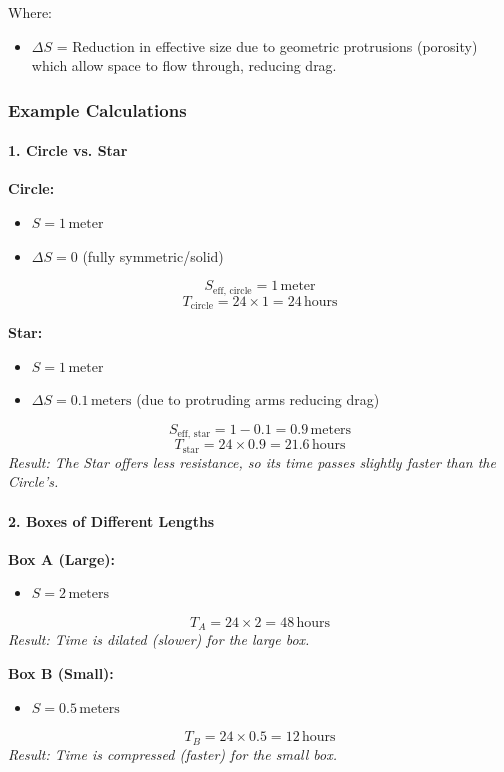 \documentclass[12pt]{article}
\begin{document}
Where:
\begin{itemize}
    \item \( \Delta S \) = Reduction in effective size due to geometric protrusions (porosity) which allow space to flow through, reducing drag.
\end{itemize}

\subsubsection{Example Calculations}

\paragraph{1. Circle vs. Star}

\textbf{Circle:}
\begin{itemize}
    \item \( S = 1 \, \text{meter} \)
    \item \( \Delta S = 0 \) (fully symmetric/solid)
\end{itemize}
\[
S_{\text{eff, circle}} = 1 \, \text{meter}
\]
\[
T_{\text{circle}} = 24 \times 1 = 24 \, \text{hours}
\]

\textbf{Star:}
\begin{itemize}
    \item \( S = 1 \, \text{meter} \)
    \item \( \Delta S = 0.1 \, \text{meters} \) (due to protruding arms reducing drag)
\end{itemize}
\[
S_{\text{eff, star}} = 1 - 0.1 = 0.9 \, \text{meters}
\]
\[
T_{\text{star}} = 24 \times 0.9 = 21.6 \, \text{hours}
\]
\textit{Result: The Star offers less resistance, so its time passes slightly faster than the Circle's.}

\paragraph{2. Boxes of Different Lengths}

\textbf{Box A (Large):}
\begin{itemize}
    \item \( S = 2 \, \text{meters} \)
\end{itemize}
\[
T_A = 24 \times 2 = 48 \, \text{hours}
\]
\textit{Result: Time is dilated (slower) for the large box.}

\textbf{Box B (Small):}
\begin{itemize}
    \item \( S = 0.5 \, \text{meters} \)
\end{itemize}
\[
T_B = 24 \times 0.5 = 12 \, \text{hours}
\]
\textit{Result: Time is compressed (faster) for the small box.}
\end{document}
